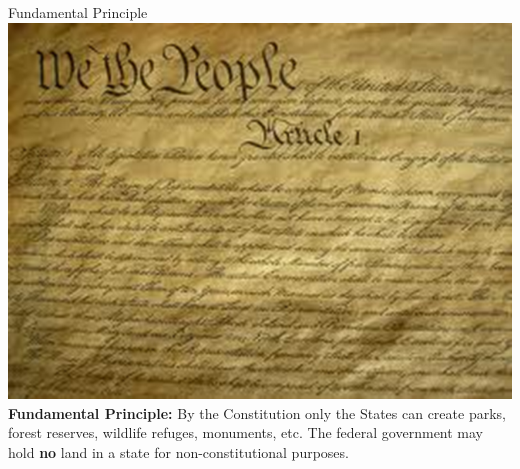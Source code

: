 \begin{frame}{Fundamental Principle}
   \centering
   \includegraphics[height=.6\textheight]{img/constitution.png} \\
   \textbf{Fundamental Principle:} By the Constitution only the States can
   create parks, forest reserves, wildlife refuges, monuments, etc. The
   federal government may hold \textbf{no} land in a state for
   non-constitutional purposes.
\end{frame}

